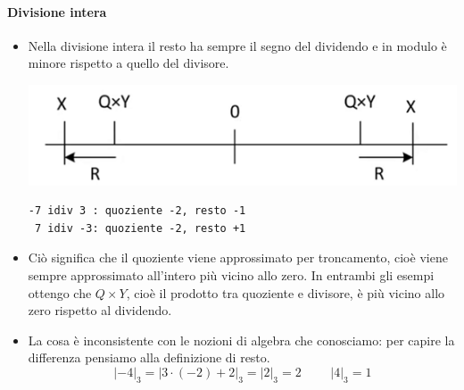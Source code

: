 \documentclass[11pt]{report}
\begin{document}
\paragraph{Divisione intera} 
\begin{itemize}
\item Nella divisione intera il resto ha sempre il segno del dividendo e in modulo è minore rispetto a quello del divisore. 
\begin{center}
\includegraphics{img/199.PNG}
\end{center}
\begin{verbatim}
-7 idiv 3 : quoziente -2, resto -1
 7 idiv -3: quoziente -2, resto +1
\end{verbatim}
\item Ciò significa che il quoziente viene approssimato per troncamento, cioè viene sempre approssimato all'intero più vicino allo zero. In entrambi gli esempi ottengo che $Q \times Y$, cioè il prodotto tra quoziente e divisore, è più vicino allo zero rispetto al dividendo.
\item La cosa è inconsistente con le nozioni di algebra che conosciamo: per capire la differenza pensiamo alla definizione di resto.
\[|-4|_3=|3 \cdot (-2) + 2|_3=|2|_3=2\,\,\,\,\,\,\,\,\,\,\,\,\,\,|4|_3=1\]
\end{itemize}
\end{document}
